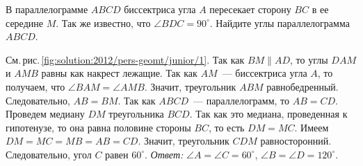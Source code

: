 В параллелограмме $ABCD$ биссектриса угла $A$ пересекает сторону $BC$ в ее
середине $M$.
Так же известно, что $\angle BDC = 90^\circ$.
Найдите углы параллелограмма $ABCD$.

%
\label{solution:2012/pers-geomt/junior/1}%
См.\,рис.\,\ref{fig:solution:2012/pers-geomt/junior/1}.
Так как $BM \parallel AD$, то углы $DAM$ и $AMB$ равны как накрест лежащие.
Так как $AM$~--- биссектриса угла $A$, то получаем, что
$\angle BAM = \angle AMB$.
Значит, треугольник $ABM$ равнобедренный.
Следовательно, $AB = BM$.
Так как $ABCD$~--- параллелограмм, то $AB = CD$.
Проведем медиану $DM$ треугольника $BCD$.
Так как это медиана, проведенная к гипотенузе, то она равна половине стороны
$BC$, то есть $DM = MC$.
Имеем $DM = MC = MB = AB = CD$.
Значит, треугольник $CDM$ равносторонний.
Следовательно, угол $C$ равен $60^\circ$.
\emph{Ответ:}
$\angle A = \angle C = 60^\circ$,
$\angle B = \angle D = 120^\circ$.

